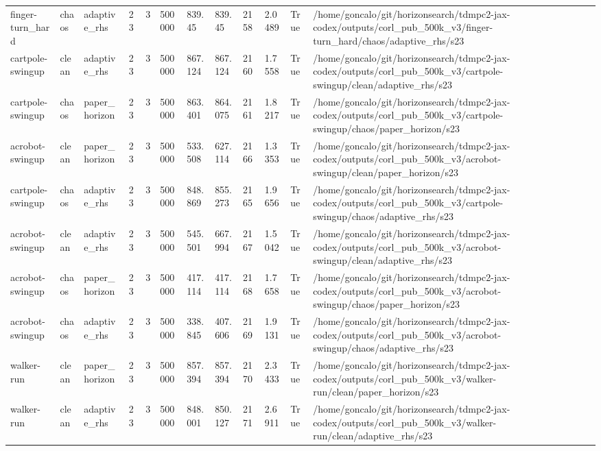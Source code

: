 \begin{tabular}{llllllllllll}
finger-turn\_hard & chaos & adaptive\_rhs & 23 & 3 & 500000 & 839.45 & 839.45 & 2158 & 2.0489 & True & /home/goncalo/git/horizonsearch/tdmpc2-jax-codex/outputs/corl\_pub\_500k\_v3/finger-turn\_hard/chaos/adaptive\_rhs/s23 \\
cartpole-swingup & clean & adaptive\_rhs & 23 & 3 & 500000 & 867.124 & 867.124 & 2160 & 1.7558 & True & /home/goncalo/git/horizonsearch/tdmpc2-jax-codex/outputs/corl\_pub\_500k\_v3/cartpole-swingup/clean/adaptive\_rhs/s23 \\
cartpole-swingup & chaos & paper\_horizon & 23 & 3 & 500000 & 863.401 & 864.075 & 2161 & 1.8217 & True & /home/goncalo/git/horizonsearch/tdmpc2-jax-codex/outputs/corl\_pub\_500k\_v3/cartpole-swingup/chaos/paper\_horizon/s23 \\
acrobot-swingup & clean & paper\_horizon & 23 & 3 & 500000 & 533.508 & 627.114 & 2166 & 1.3353 & True & /home/goncalo/git/horizonsearch/tdmpc2-jax-codex/outputs/corl\_pub\_500k\_v3/acrobot-swingup/clean/paper\_horizon/s23 \\
cartpole-swingup & chaos & adaptive\_rhs & 23 & 3 & 500000 & 848.869 & 855.273 & 2165 & 1.9656 & True & /home/goncalo/git/horizonsearch/tdmpc2-jax-codex/outputs/corl\_pub\_500k\_v3/cartpole-swingup/chaos/adaptive\_rhs/s23 \\
acrobot-swingup & clean & adaptive\_rhs & 23 & 3 & 500000 & 545.501 & 667.994 & 2167 & 1.5042 & True & /home/goncalo/git/horizonsearch/tdmpc2-jax-codex/outputs/corl\_pub\_500k\_v3/acrobot-swingup/clean/adaptive\_rhs/s23 \\
acrobot-swingup & chaos & paper\_horizon & 23 & 3 & 500000 & 417.114 & 417.114 & 2168 & 1.7658 & True & /home/goncalo/git/horizonsearch/tdmpc2-jax-codex/outputs/corl\_pub\_500k\_v3/acrobot-swingup/chaos/paper\_horizon/s23 \\
acrobot-swingup & chaos & adaptive\_rhs & 23 & 3 & 500000 & 338.845 & 407.606 & 2169 & 1.9131 & True & /home/goncalo/git/horizonsearch/tdmpc2-jax-codex/outputs/corl\_pub\_500k\_v3/acrobot-swingup/chaos/adaptive\_rhs/s23 \\
walker-run & clean & paper\_horizon & 23 & 3 & 500000 & 857.394 & 857.394 & 2170 & 2.3433 & True & /home/goncalo/git/horizonsearch/tdmpc2-jax-codex/outputs/corl\_pub\_500k\_v3/walker-run/clean/paper\_horizon/s23 \\
walker-run & clean & adaptive\_rhs & 23 & 3 & 500000 & 848.001 & 850.127 & 2171 & 2.6911 & True & /home/goncalo/git/horizonsearch/tdmpc2-jax-codex/outputs/corl\_pub\_500k\_v3/walker-run/clean/adaptive\_rhs/s23 \\

\end{tabular}
